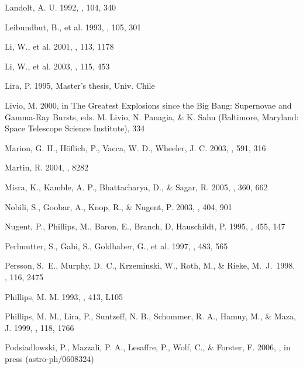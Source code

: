 \documentclass[12pt,preprint,psfig,epsf]{aastex}
\begin{document}
\begin{thebibliography}{}
 Landolt, A. U. 1992, \aj, 104, 340

 Leibundbut, B., et al. 1993,
\aj, 105, 301

 Li, W., et al. 2001, \pasp, 113, 1178

 Li, W., et al. 2003, \pasp, 115, 453

 Lira, P. 1995, Master's thesis, Univ. Chile

 Livio, M. 2000, in The Greatest Explosions since
the Big Bang: Supernovae and Gamma-Ray Bursts, eds. M. Livio, N. Panagia, \&
K. Sahu (Baltimore, Maryland: Space Telescope Science Institute), 334

Marion, G. H., H\"oflich, P., Vacca, W. D., Wheeler, J. C. 2003, \apj, 591, 316

 Martin, R. 2004, \iaucirc, 8282


 Misra, K., Kamble, A. P.,
Bhattacharya, D., \& Sagar, R. 2005, \mnras, 360, 662

 Nobili, S., Goobar, A.,
Knop, R., \& Nugent, P. 2003, \aap, 404, 901

 Nugent, P.,  Phillips, M.,
 Baron, E., Branch, D, Hauschildt, P. 1995, \apjl, 455, 147



 Perlmutter, S., Gabi, S.,
Goldhaber, G., et al. 1997, \apj, 483, 565

 Persson, S.~E., Murphy,
D.~C., Krzeminski, W., Roth, M., \& Rieke, M.~J.\ 1998, \aj, 116, 2475

 Phillips, M. M. 1993, \apjl, 413, L105

 Phillips, M. M., Lira, P.,
Suntzeff, N. B., Schommer, R. A., Hamuy, M., \& Maza, J. 1999, \aj, 118, 1766

 Podsiadlowski, P., Mazzali,
P. A., Lesaffre, P., Wolf, C., \& Forster, F. 2006, \mnras, in press (astro-ph/0608324)


\end{thebibliography}
\end{document}
